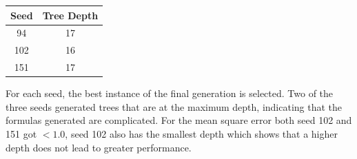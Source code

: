 \documentclass{article}
\begin{document}
\begin{center}
\begin{tabular}{|c|c|}
\hline
Seed & Tree Depth \\
\hline
94 & 17 \\
\hline
102 & 16 \\
\hline
151 & 17 \\
\hline
\end{tabular}
\end{center}
For each seed, the best instance of the final generation is selected. Two of the three seeds generated trees that are at the maximum depth, indicating that the formulas generated are complicated. For the mean square error both seed 102 and 151 got $< 1.0$, seed 102 also has the smallest depth which shows that a higher depth does not lead to greater performance. \par
\end{document}
